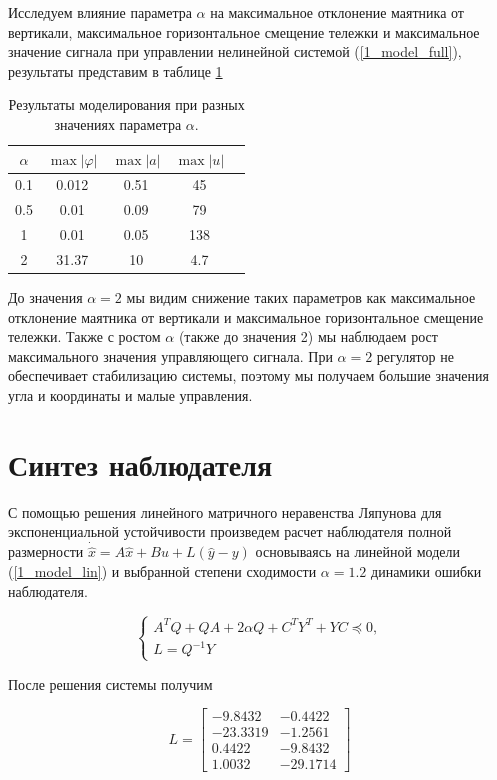 Исследуем влияние параметра $\alpha$ на максимальное отклонение маятника от вертикали, максимальное горизонтальное смещение тележки и максимальное значение сигнала при управлении нелинейной системой (\ref{1_model_full}), результаты представим в таблице \ref{4_tab_4}


\begin{table}[h]
\centering
\caption{Результаты моделирования при разных значениях параметра $\alpha$.}
\label{4_tab_4}
\begin{tabular}{ccccc}
\toprule
$\alpha$ & $\max |\varphi|$ & $\max |a|$ & $\max |u|$ \\
\midrule
0.1  &  0.012  &  0.51  &  45 \\
0.5  &  0.01  &  0.09  &   79 \\
1 &  0.01  &  0.05  &  138  \\
2  &  31.37  &  10 &   4.7 \\
\bottomrule
\end{tabular}
\end{table}

До значения $\alpha=2$ мы видим снижение таких параметров как максимальное отклонение маятника от вертикали и максимальное горизонтальное смещение тележки. Также с ростом $\alpha$ (также до значения 2) мы наблюдаем рост максимального значения управляющего сигнала. При $\alpha=2$ регулятор не обеспечивает стабилизацию системы, поэтому мы получаем большие значения угла и координаты и малые управления.

\section{Синтез наблюдателя}
С помощью решения линейного матричного неравенства Ляпунова для экспоненциальной устойчивости произведем расчет наблюдателя полной размерности
$\dot{\hat{x}} = A\hat{x} + Bu + L(\hat{y} - y)$
основываясь на линейной модели (\ref{1_model_lin}) и выбранной степени сходимости $\alpha = 1.2$ динамики ошибки наблюдателя.

\begin{equation}
    \begin{cases}
        A^T Q +QA+2 \alpha Q + C^TY^T+YC \preceq 0,\\
        L = Q^{-1}Y
    \end{cases}
\end{equation}

После решения системы получим

\begin{equation}
    L = \begin{bmatrix}
        -9.8432	&-0.4422\\
-23.3319	&-1.2561\\
0.4422	&-9.8432\\
1.0032	&-29.1714
    \end{bmatrix}
\end{equation}




